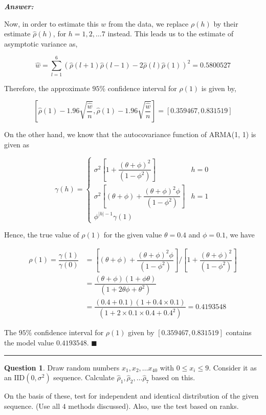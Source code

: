 \documentclass[12pt]{article}
\theoremstyle{definition}
\newtheorem{question}{Question}
\newenvironment{answer}{
    \textbf{\textit{Answer:}} \qquad
}{\hfill $\blacksquare$ \\ \begin{center}
    \rule{0.6\linewidth}{0.5px}    
\end{center}
}
\begin{document}
\begin{answer}
    Now, in order to estimate this $w$ from the data, we replace $\rho(h)$ by their estimate $\widehat{\rho}(h)$, for $h = 1, 2, \dots 7$ instead. This leads us to the estimate of asymptotic variance as,

    $$
    \widehat{w} = \sum_{l = 1}^{6} (\widehat{\rho}(l+1)\widehat{\rho}(l-1) - 2\widehat{\rho}(l)\widehat{\rho}(1))^2 = 0.5800527
    $$

    Therefore, the approximate $95\%$ confidence interval for $\rho(1)$ is given by,

    $$
    \left[ \widehat{\rho}(1) - 1.96\sqrt{\dfrac{\widehat{w}}{n}},
    \widehat{\rho}(1) - 1.96\sqrt{\dfrac{\widehat{w}}{n}} \right]
    = [0.359467, 0.831519]
    $$

    On the other hand, we know that the autocovariance function of ARMA(1, 1) is given as 

    $$
    \gamma(h) = \begin{cases}
        \sigma^2 \left[ 1 + \dfrac{(\theta + \phi)^2}{(1 - \phi^2)} \right] & h = 0\\
        \sigma^2 \left[ (\theta + \phi) + \dfrac{(\theta + \phi)^2\phi }{(1 - \phi^2)} \right] & h = 1\\
        \phi^{|h| - 1} \gamma(1)
    \end{cases}
    $$
    
    Hence, the true value of $\rho(1)$ for the given value $\theta = 0.4$ and $\phi = 0.1$, we have 
    
    \begin{align*}
        \rho(1) = \dfrac{\gamma(1)}{\gamma(0)} & = \left[ (\theta + \phi) + \dfrac{(\theta + \phi)^2\phi }{(1 - \phi^2)} \right] / \left[ 1 + \dfrac{(\theta + \phi)^2}{(1 - \phi^2)} \right] \\
        & = \dfrac{(\theta + \phi)(1 + \phi\theta)}{(1 + 2\theta\phi + \theta^2)} \\
        & = \dfrac{(0.4 + 0.1)(1 + 0.4 \times 0.1)}{(1 + 2\times 0.1 \times 0.4 + 0.4^2)} = 0.4193548
    \end{align*}

    The $95\%$ confidence interval for $\rho(1)$ given by $[0.359467, 0.831519]$ contains the model value $0.4193548$.
\end{answer}




\begin{question}
    Draw random numbers $x_1, x_2, \dots x_{40}$ with $0 \leq x_i \leq 9$. Consider it as an $\text{IID}(0, \sigma^2)$ sequence. Calculate $\widehat{\rho}_1, \widehat{\rho}_2, \dots \widehat{\rho}_7$ based on this.

    On the basis of these, test for independent and identical distribution of the given sequence. (Use all $4$ methods discussed). Also, use the test based on ranks.
\end{question}
\end{document}
